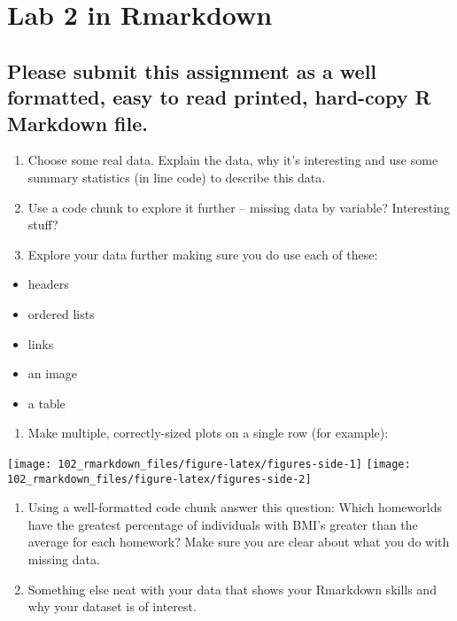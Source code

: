 \documentclass[
]{book}
\providecommand{\tightlist}{%
  \setlength{\itemsep}{0pt}\setlength{\parskip}{0pt}}
\begin{document}
\hypertarget{lab-2-in-rmarkdown}{%
\chapter{Lab 2 in Rmarkdown}\label{lab-2-in-rmarkdown}}

\hypertarget{please-submit-this-assignment-as-a-well-formatted-easy-to-read-printed-hard-copy-r-markdown-file.}{%
\section{Please submit this assignment as a well formatted, easy to read printed, hard-copy R Markdown file.}\label{please-submit-this-assignment-as-a-well-formatted-easy-to-read-printed-hard-copy-r-markdown-file.}}

\begin{enumerate}
\def\labelenumi{\arabic{enumi}.}
\item
  Choose some real data. Explain the data, why it's interesting and use some summary statistics (in line code) to describe this data.
\item
  Use a code chunk to explore it further -- missing data by variable? Interesting stuff?
\item
  Explore your data further making sure you do use each of these:
\end{enumerate}

\begin{itemize}
\tightlist
\item
  headers
\item
  ordered lists
\item
  links
\item
  an image
\item
  a table
\end{itemize}

\begin{enumerate}
\def\labelenumi{\arabic{enumi}.}
\setcounter{enumi}{3}
\tightlist
\item
  Make multiple, correctly-sized plots on a single row (for example):
\end{enumerate}

\texttt{[image: 102\_rmarkdown\_files/figure-latex/figures-side-1]} \texttt{[image: 102\_rmarkdown\_files/figure-latex/figures-side-2]}

\begin{enumerate}
\def\labelenumi{\arabic{enumi}.}
\setcounter{enumi}{4}
\item
  Using a well-formatted code chunk answer this question: Which homeworlds have the greatest percentage of individuals with BMI's greater than the average for each homework? Make sure you are clear about what you do with missing data.
\item
  Something else neat with your data that shows your Rmarkdown skills and why your dataset is of interest.
\end{enumerate}

  
\end{document}

